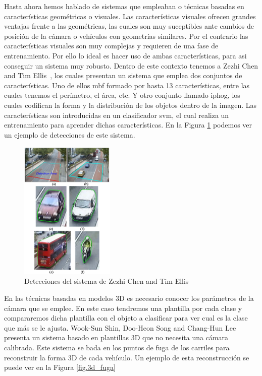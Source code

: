 Hasta ahora hemos hablado de sistemas que empleaban o técnicas basadas en características geométricas o visuales. Las características visuales ofrecen grandes ventajas frente a las geométricas, las cuales son muy suceptibles ante cambios de posición de la cámara o vehículos con geometrías similares. Por el contrario las características visuales son muy complejas y requieren de una fase de entrenamiento. Por ello lo ideal es hacer uso de ambas características, para asi conseguir un sistema muy robusto. Dentro de este contexto tenemos a Zezhi Chen and Tim Ellis~\cite{multi_shape_descriptor}, los cuales presentan un sistema que emplea dos conjuntos de características. Uno de ellos \acrfull{mbf} formado por hasta 13 características, entre las cuales tenemos el perímetro, el área, etc. Y otro conjunto llamado \acrfull{iphog}, los cuales codifican la forma y la distribución de los objetos dentro de la imagen. Las características son introducidas en un clasificador \acrshort{svm}, el cual realiza un entrenamiento para aprender dichas características. En la Figura \ref{fig.multi_shape_descriptor} podemos ver un ejemplo de detecciones de este sistema.

\begin{figure}[H]
  \begin{center}
    \includegraphics[width=0.4\textwidth]{figures/Estado_arte/svm_iphog.png}
		\caption{Detecciones del sistema de  Zezhi Chen and Tim Ellis~\cite{multi_shape_descriptor}}
		\label{fig.multi_shape_descriptor}
		\end{center}
\end{figure}

En las técnicas basadas en modelos 3D es necesario conocer los parámetros de la cámara que se emplee. En este caso tendremos una plantilla por cada clase y compararemos dicha plantilla con el objeto a clasificar para ver cual es la clase que más se le ajusta.
Wook-Sun Shin, Doo-Heon Song and Chang-Hun Lee~\cite{vehicle_classification_by_road} presenta  un  sistema  basado  en  plantillas  3D  que  no necesita una cámara calibrada. Este sistema se bada en los puntos de fuga de los carriles para reconstruir la forma 3D de cada vehículo. Un ejemplo de esta reconstrucción se puede ver en la Figura \ref{fig.3d_fuga}

